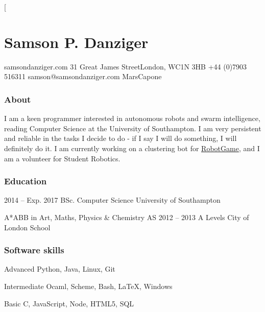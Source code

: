 \documentclass{tccv}
\begin{document}
\twocolumn[

\part{Samson P. Danziger}

\begin{multicols}{2}
    \personal
        {samsondanziger.com}
        {31 Great James Street\newline London, WC1N 3HB}
        {+44 (0)7903 516311}
        {samson@samsondanziger.com}
        {MarsCapone}

    \section{About}
        I am a keen programmer interested in autonomous robots and swarm intelligence, reading Computer Science at the University of Southampton. I am very persistent and reliable in the tasks I decide to do - if I say I will do something, I will definitely do it. I am currently working on a clustering bot for \href{https://robotgame.net}{RobotGame}, and I am a volunteer for Student Robotics.

\end{multicols}

\hline
\bigskip

\begin{multicols}{2}
    \section{Education}

        \begin{yearlist}

        \item{2014 -- Exp. 2017}
             {BSc. Computer Science}
             {University of Southampton}

        {\item[A*ABB in Art, Maths, Physics \& Chemistry AS]{2012 -- 2013}
             {A Levels}
             {City of London School}}


        \end{yearlist}

    \section{Software skills}

        \begin{factlist}

        \item{Advanced}
             {Python, Java, Linux, Git}

        \item{Intermediate}
             {Ocaml, Scheme, Bash, \LaTeX, Windows}

        \item{Basic}
             {C, JavaScript, Node, HTML5, SQL}

        \end{factlist}

\end{multicols}
\end{document}
